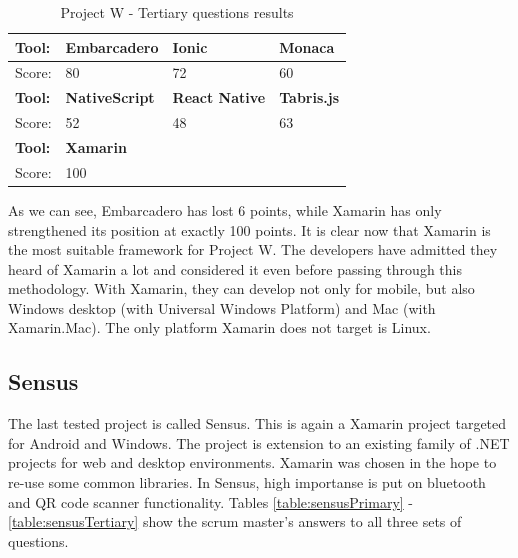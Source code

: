 \documentclass[english,master,public,dept460,male,cpdeclaration,oneside]{diploma}
\begin{document}
\begin{table}[!h]
	\centering
	\caption{Project W - Tertiary questions results}
	\label{table:wResults3}
	\begin{tabular}{p{4cm} | p{3cm} | p{3cm} | p{3cm}}
		\toprule		
		\textbf{Tool:} & \textbf{Embarcadero} & \textbf{Ionic} & \textbf{Monaca} \\ 
		\midrule
		Score: & 80 & 72 & 60 \\ 
		\midrule
		\textbf{Tool:} & \textbf{NativeScript} & \textbf{React Native} & \textbf{Tabris.js} \\
		\midrule
		Score: & 52 & 48 & 63 \\
		\midrule
		\textbf{Tool:}& \textbf{Xamarin} & & \\	
		\midrule
		Score: & 100 & & \\	
		\midrule
	\end{tabular}
\end{table}

As we can see, Embarcadero has lost 6 points, while Xamarin has only strengthened its position at exactly 100 points. It is clear now that Xamarin is the most suitable framework for Project W. The developers have admitted they heard of Xamarin a lot and considered it even before passing through this methodology. With Xamarin, they can develop not only for mobile, but also Windows desktop (with Universal Windows Platform) and Mac (with Xamarin.Mac). The only platform Xamarin does not target is Linux.

\subsection{Sensus}

The last tested project is called Sensus. This is again a Xamarin project targeted for Android and Windows. The project is extension to an existing family of .NET projects for web and desktop environments. Xamarin was chosen in the hope to re-use some common libraries. In Sensus, high importanse is put on bluetooth and QR code scanner functionality. Tables \ref{table:sensusPrimary} - \ref{table:sensusTertiary} show the scrum master's answers to all three sets of questions.
\end{document}
